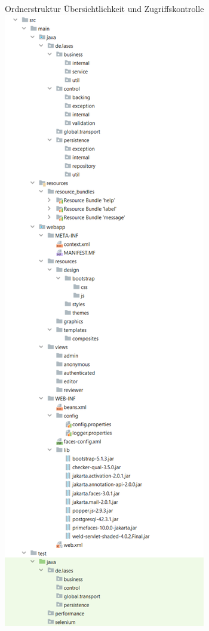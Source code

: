 \documentclass{beamer}
\begin{document}
    \begin{frame}{Ordnerstruktur}
        Übersichtlichkeit und Zugriffskontrolle
        \centering
        \includegraphics[height=1.1\textheight]{graphics/w2_folder_final}

\end{frame}
\end{document}
